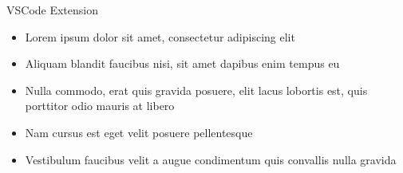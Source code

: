 \begin{frame}{VSCode Extension}
    \begin{itemize}
        \item Lorem ipsum dolor sit amet, consectetur adipiscing elit
        \item Aliquam blandit faucibus nisi, sit amet dapibus enim tempus eu
        \item Nulla commodo, erat quis gravida posuere, elit lacus lobortis est, quis porttitor odio mauris at libero
        \item Nam cursus est eget velit posuere pellentesque
        \item Vestibulum faucibus velit a augue condimentum quis convallis nulla gravida
    \end{itemize}
\end{frame}


